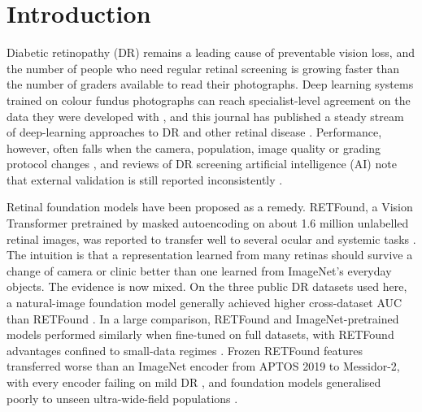 \documentclass[pdflatex,sn-basic,Numbered]{sn-jnl}
\begin{document}

\maketitle

\section{Introduction}\label{sec:intro}

Diabetic retinopathy (DR) remains a leading cause of preventable vision loss, and the number of people who need regular retinal screening is growing faster than the number of graders available to read their photographs. Deep learning systems trained on colour fundus photographs can reach specialist-level agreement on the data they were developed with \cite{gulshan2016,ting2017}, and this journal has published a steady stream of deep-learning approaches to DR and other retinal disease \cite{nagasawa2019,mahapadi2025,yuan2023}. Performance, however, often falls when the camera, population, image quality or grading protocol changes \cite{beede2020,dai2021spectrum}, and reviews of DR screening artificial intelligence (AI) note that external validation is still reported inconsistently \cite{grzybowski2020review,tripodai2024}.

Retinal foundation models have been proposed as a remedy. RETFound, a Vision Transformer \cite{dosovitskiy2021vit} pretrained by masked autoencoding \cite{he2022mae} on about 1.6 million unlabelled retinal images, was reported to transfer well to several ocular and systemic tasks \cite{zhou2023retfound}. The intuition is that a representation learned from many retinas should survive a change of camera or clinic better than one learned from ImageNet's everyday objects. The evidence is now mixed. On the three public DR datasets used here, a natural-image foundation model generally achieved higher cross-dataset AUC than RETFound \cite{hou2025dinov2}. In a large comparison, RETFound and ImageNet-pretrained models performed similarly when fine-tuned on full datasets, with RETFound advantages confined to small-data regimes \cite{yew2026}. Frozen RETFound features transferred worse than an ImageNet encoder from APTOS 2019 to Messidor-2, with every encoder failing on mild DR \cite{poyrazer2026}, and foundation models generalised poorly to unseen ultra-wide-field populations \cite{li2026uwf}.
\end{document}
